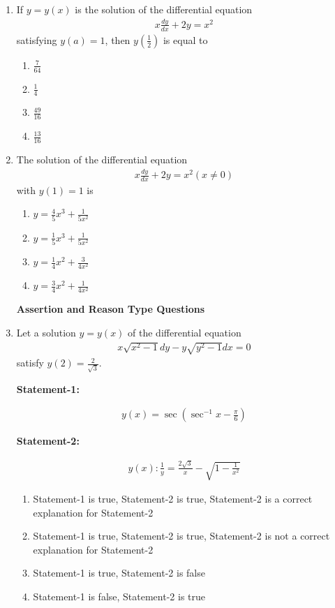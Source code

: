 \begin{enumerate}[label=\arabic*.,ref=\thesubsection.\theenumi]
\item If $y = y(x)$ is the solution of the differential equation 
\begin{align*}
x\frac{dy}{dx} + 2y = x^2
\end{align*}
satisfying $y(a) = 1$, then $y\left(\frac{1}{2}\right)$ is equal to
\begin{enumerate}
\item $\frac{7}{64}$
\item $\frac{1}{4}$
\item $\frac{49}{16}$
\item $\frac{13}{16}$
\end{enumerate}

\item The solution of the differential equation 
\begin{align*}
x\frac{dy}{dx} + 2y = x^2 (x \neq 0)
\end{align*}
with $y(1) = 1$ is
\begin{enumerate}
\item $y = \frac{4}{5}x^3 + \frac{1}{5x^2}$
\item $y = \frac{1}{5}x^3 + \frac{1}{5x^2}$
\item $y = \frac{1}{4}x^2 + \frac{3}{4x^2}$
\item $y = \frac{3}{4}x^2 + \frac{1}{4x^2}$
\end{enumerate}

\textbf{Assertion and Reason Type Questions}

\item Let a solution $y = y(x)$ of the differential equation
\begin{align*}
x\sqrt{x^2 - 1}dy - y\sqrt{y^2 - 1}dx = 0
\end{align*}
satisfy $y(2) = \frac{2}{\sqrt{3}}$.

\textbf{Statement-1:}

\begin{align*}
y(x) = \sec\left(\sec^{-1}x - \frac{\pi}{6}\right)
\end{align*}

\textbf{Statement-2:} 

\begin{align*}
y(x): \frac{1}{y} = \frac{2\sqrt{3}}{x} - \sqrt{1 - \frac{1}{x^2}}
\end{align*}
\begin{enumerate}
\item Statement-1 is true, Statement-2 is true, Statement-2 is a correct explanation for Statement-2
\item Statement-1 is true, Statement-2 is true, Statement-2 is not a correct explanation for Statement-2
\item Statement-1 is true, Statement-2 is false
\item Statement-1 is false, Statement-2 is true
\end{enumerate}


\end{enumerate}
